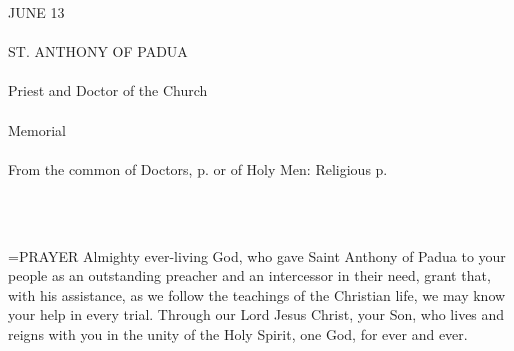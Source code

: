 \begin{center}\normalsize \begin{center}\normalsize JUNE 13\\\\
\footnotesize \footnotesize ST. ANTHONY OF PADUA\\\\
\footnotesize \footnotesize Priest and Doctor of the Church\\\\
\footnotesize \footnotesize Memorial\\\\
\footnotesize \footnotesize From the common of Doctors, p.   or of Holy Men: Religious p. \\\\
\footnotesize \end{center}\\
\end{center}

\hangindent=\parindent \small{PRAYER 
Almighty ever-living God,
who gave Saint Anthony of Padua to your people
as an outstanding preacher
and an intercessor in their need,
grant that, with his assistance,
as we follow the teachings of the Christian life,
we may know your help in every trial.
Through our Lord Jesus Christ, your Son,
who lives and reigns with you in the unity of the Holy Spirit,
one God, for ever and ever.\\}
 

